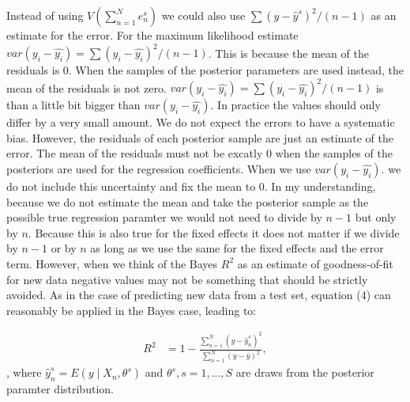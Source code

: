 \documentclass[11pt,a4paper,twoside]{book}
\begin{document}
Instead of using $V(\sum_{n=1}^{N}e^s_{n})$ we could also use $ \sum(y - \hat{y}^s)^2/(n-1) $ as an estimate for the error. For the maximum likelihood estimate $var(y_{i} - \hat{y_{i}}) = \sum (y_{i} - \hat{y_{i}})^2/ (n-1) $. This is because the mean of the residuals is 0. When the  samples of the posterior parameters are used instead, the mean of the residuals is not zero. $var(y_{i} - \hat{y_{i}}) = \sum (y_{i} - \hat{y_{i}})^2/ (n-1) $ is than a little bit bigger than $var(y_{i} - \hat{y_{i}}). $ In practice the values should only differ by a very small amount. We do not expect the errors to have a systematic bias. However, the residuals of each posterior sample are just an estimate of the error. The mean of the residuals must not be excatly 0 when the samples of the posteriors are used for the regression coefficients. When we use $var(y_{i} - \hat{y_{i}}). $ we do not include this uncertainty and fix the mean to 0. In my understanding, because we do not estimate the mean and take the posterior sample as the possible true regression paramter we would not need to divide by $n-1$ but only by $n$. Because this is also true for the fixed effects it does not matter if we divide by $n-1$ or by $n$ as long as we use the same for the fixed effects and the error term.  However, when we think of the Bayes $R^2$ as an estimate of goodness-of-fit for new data negative values may not be something that should be strictly avoided. As in the case of predicting new data from a test set, equation (4) can reasonably be applied in the Bayes case, leading to:

      \begin{align} 
        R^2 &= 1 - \frac{\sum_{n=1}^{N}(y - \hat{y}^s_{n})^2}{\sum_{n=1}^{N}(y-\bar{y})^2}   \label{eq:7},
    \end{align} 
, where $\hat{y}^s_{n}  = E \left({y \mid X_{n}, \theta^s}\right) $ and $\theta^s, s = 1, ... , S$ are draws from the posterior paramter distribution.








  
  
  
 
   
   
   
   
   

 

\end{document}
